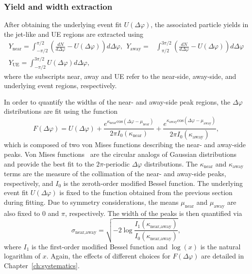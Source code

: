 \subsubsection{Yield and width extraction}
 After obtaining the underlying event fit $U(\Delta\varphi)$, the associated particle yields in the jet-like and UE regions are extracted using
\begin{eqnarray}
    Y_{\text{near}} = \int_{-\pi/2}^{\pi/2} (\frac{dN}{d\Delta\varphi}- U(\Delta\varphi))d\Delta\varphi,  \  \ Y_{\text{away}} = & \int_{\pi/2}^{3\pi/2} (\frac{dN}{d\Delta\varphi}- U(\Delta\varphi))d\Delta\varphi 
    \label{eq:jet_yields}
    \\ 
    Y_{\text{UE}} = \int_{-\pi/2}^{3\pi/2} U(\Delta\varphi)d\Delta\varphi,
\label{eq:ue_yield}
\end{eqnarray}
%
where the subscripts near, away and UE refer to the near-side, away-side, and underlying event regions, respectively.

In order to quantify the widths of the near- and away-side peak regions, the $\Delta\varphi$ distributions are fit using the function
%
\begin{equation}
    F(\Delta\varphi) = U(\Delta\varphi) + \frac{e^{\kappa_{\text{near}}\text{cos}(\Delta\varphi - \mu_{\text{near}})}}{2\pi I_0(\kappa_{\text{near}})} + \frac{e^{\kappa_{\text{away}}\text{cos}(\Delta\varphi - \mu_{\text{away}})}}{2\pi I_0(\kappa_{\text{away}})},
\label{eq:fullfit}
\end{equation}
%
which is composed of two von Mises functions describing the near- and away-side peaks. Von Mises functions~\cite{VonMises1, VonMises2} are the circular analogs of Gaussian distributions and provide the best fit to the $2\pi$-periodic $\Delta\varphi$ distributions. The $\kappa_{\text{near}}$ and $\kappa_{\text{away}}$ terms are the measure of the collimation of the near- and away-side peaks, respectively, and $I_{0}$ is the zeroth-order modified Bessel function. The underlying event fit $U(\Delta\varphi)$ is fixed to the function obtained from the previous section during fitting. Due to symmetry considerations, the means $\mu_{\text{near}}$ and  $\mu_{\text{away}}$ are also fixed to $0$ and  $\pi$, respectively. The width of the peaks is then quantified via~\cite{VonMises1}
%
\begin{equation}
    \sigma_{\text{near,away}} = \sqrt{-2\log\frac{I_1(\kappa_{\text{near,away}})}{I_0(\kappa_{\text{near,away}})}},
\label{eq:width}
\end{equation}
%
where $I_1$ is the first-order modified Bessel function and $\log(x)$ is the natural logarithm of $x$. Again, the effects of different choices for $F(\Delta\varphi)$ are detailed in Chapter~\ref{ch:systematics}.